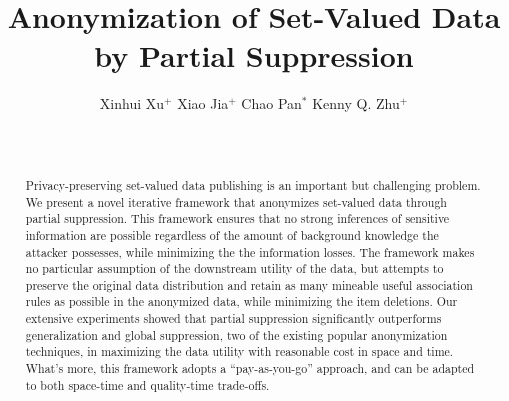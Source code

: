 \documentclass{vldb}
\begin{document}
\title{Anonymization of Set-Valued Data by Partial Suppression}

\author{
\alignauthor
Xinhui Xu$^+$ \hspace*{5mm} Xiao Jia$^+$ \hspace*{5mm}
Chao Pan$^*$ \hspace*{5mm} Kenny Q. Zhu$^+$\\
\\
\\
}
\maketitle

\begin{abstract}
Privacy-preserving set-valued data publishing is an important but
challenging problem. We present a novel iterative framework that anonymizes
set-valued data through partial suppression. This framework ensures that
no strong inferences of sensitive information are possible regardless of
the amount of background knowledge the attacker possesses, while minimizing the
the information losses. The framework makes no particular assumption of
the downstream utility of the data, but attempts to preserve the original
data distribution and retain as many mineable useful association rules
as possible in the anonymized data, while minimizing the item deletions.
Our extensive experiments showed that partial suppression significantly
outperforms generalization and global suppression, two of the existing
popular anonymization techniques, in maximizing the data utility
with reasonable cost in space and time.
What's more, this framework adopts a ``pay-as-you-go''
approach, and can be adapted to both space-time and quality-time trade-offs.
\end{abstract}















{\renewcommand{\baselinestretch}{0.95}
\normalsize


}

\end{document}
